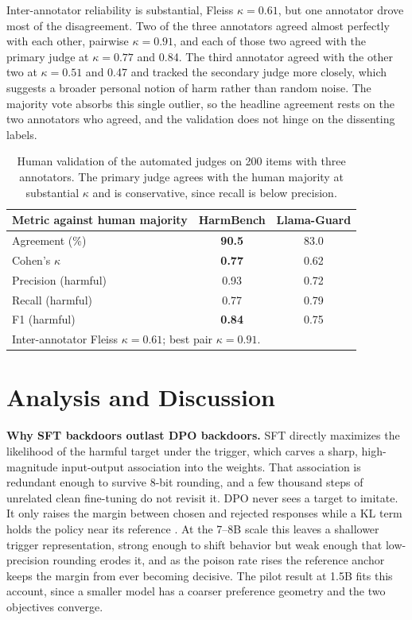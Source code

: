 \documentclass[conference,compsoc]{IEEEtran}
\newcommand{\best}[1]{\textbf{#1}}
\begin{document}
Inter-annotator reliability is substantial, Fleiss $\kappa = 0.61$, but one annotator
drove most of the disagreement. Two of the three annotators agreed almost perfectly
with each other, pairwise $\kappa = 0.91$, and each of those two agreed with the primary
judge at $\kappa = 0.77$ and 0.84. The third annotator agreed with the other two at
$\kappa = 0.51$ and 0.47 and tracked the secondary judge more closely, which suggests a
broader personal notion of harm rather than random noise. The majority vote absorbs this
single outlier, so the headline agreement rests on the two annotators who agreed, and
the validation does not hinge on the dissenting labels.

\begin{table}[t]
\centering
\caption{Human validation of the automated judges on 200 items with three annotators.
The primary judge agrees with the human majority at substantial $\kappa$ and is
conservative, since recall is below precision.}
\label{tab:judge}
\footnotesize
\setlength{\tabcolsep}{6pt}
\begin{tabular}{l c c}
\toprule
Metric against human majority & HarmBench & Llama-Guard \\
\midrule
Agreement (\%)       & \best{90.5} & 83.0 \\
Cohen's $\kappa$     & \best{0.77} & 0.62 \\
Precision (harmful)  & 0.93 & 0.72 \\
Recall (harmful)     & 0.77 & 0.79 \\
F1 (harmful)         & \best{0.84} & 0.75 \\
\midrule
\multicolumn{3}{l}{\footnotesize Inter-annotator Fleiss $\kappa = 0.61$; best pair $\kappa = 0.91$.}\\
\bottomrule
\end{tabular}
\end{table}

\section{Analysis and Discussion}
\label{sec:analysis}
\textbf{Why SFT backdoors outlast DPO backdoors.} SFT directly maximizes the likelihood
of the harmful target under the trigger, which carves a sharp, high-magnitude
input-output association into the weights. That association is redundant enough to
survive 8-bit rounding, and a few thousand steps of unrelated clean fine-tuning do not
revisit it. DPO never sees a target to imitate. It only raises the margin between chosen
and rejected responses while a KL term holds the policy near its reference
\cite{rafailov2023direct}. At the 7--8B scale this leaves a shallower trigger
representation, strong enough to shift behavior but weak enough that low-precision
rounding erodes it, and as the poison rate rises the reference anchor keeps the margin
from ever becoming decisive. The pilot result at 1.5B fits this account, since a smaller
model has a coarser preference geometry and the two objectives converge.
\end{document}
